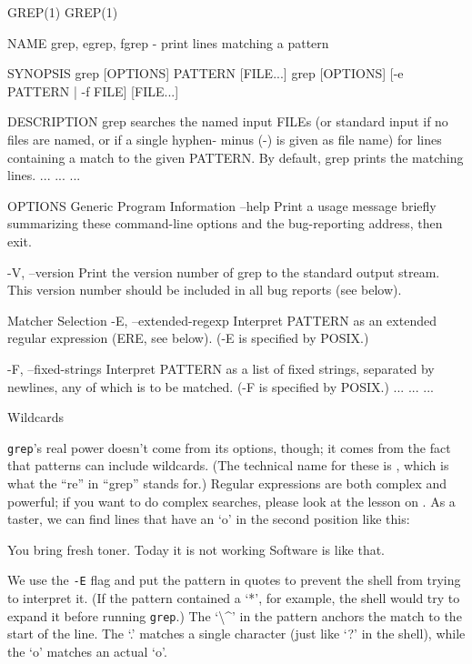 \documentclass{book}
\begin{document}
\begin{VerbOut}
GREP(1)                                                                                              GREP(1)

NAME
grep, egrep, fgrep - print lines matching a pattern

SYNOPSIS
grep [OPTIONS] PATTERN [FILE...]
grep [OPTIONS] [-e PATTERN | -f FILE] [FILE...]

DESCRIPTION
grep  searches the named input FILEs (or standard input if no files are named, or if a single hyphen-
minus (-) is given as file name) for lines containing a match to the given PATTERN.  By default, grep
prints the matching lines.
...        ...        ...

OPTIONS
Generic Program Information
--help Print  a  usage  message  briefly summarizing these command-line options and the bug-reporting
address, then exit.

-V, --version
Print the version number of grep to the standard output stream.  This version number should be
included in all bug reports (see below).

Matcher Selection
-E, --extended-regexp
Interpret  PATTERN  as  an  extended regular expression (ERE, see below).  (-E is specified by
POSIX.)

-F, --fixed-strings
Interpret PATTERN as a list of fixed strings, separated by newlines, any of  which  is  to  be
matched.  (-F is specified by POSIX.)
...        ...        ...
\end{VerbOut}

\begin{swcbox}{Wildcards}

\texttt{grep}'s real power doesn't come from its options, though; it
comes from the fact that patterns can include wildcards. (The technical
name for these is ,
which is what the ``re'' in ``grep'' stands for.) Regular expressions
are both complex and powerful; if you want to do complex searches,
please look at the lesson on . As a taster, we can find lines that have an `o' in the second
position like this:


\begin{VerbOut}
You bring fresh toner.
Today it is not working
Software is like that.
\end{VerbOut}

We use the \texttt{-E} flag and put the pattern in quotes to prevent the
shell from trying to interpret it. (If the pattern contained a `*', for
example, the shell would try to expand it before running \texttt{grep}.)
The `\textbackslash{}\^{}' in the pattern anchors the match to the start
of the line. The `.' matches a single character (just like `?' in the
shell), while the `o' matches an actual `o'.

\end{swcbox}
\end{document}
